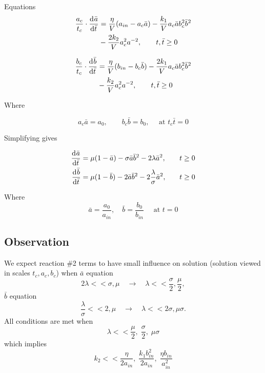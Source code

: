 \documentclass[12pt]{article}
\begin{document}
Equations
\begin{equation}
  \begin{aligned}
    \frac{a_c}{t_c}\cdot\frac{\mathrm{d}^{} {\bar{a}}}{\mathrm{d}{\bar{t}}^{}} &= \frac{\eta}{V}(a_{in}-a_c\bar{a})-\frac{k_1}{V}a_c\bar{a}b_c^2\bar{b}^2 \\
    &- \frac{2k_2}{V}a_c^2a^{-2},\qquad t,\bar{t}\ge 0 \\
  \end{aligned}
\end{equation}

\begin{equation}
  \begin{aligned}
    \frac{b_c}{t_c}\cdot\frac{\mathrm{d}^{} {\bar{b}}}{\mathrm{d}{\bar{t}}^{}} &= \frac{\eta}{V}(b_{in}-b_c\bar{b})-\frac{2k_1}{V}a_c\bar{a}b_c^2\bar{b}^2 \\
    &- \frac{k_2}{V}a_c^2a^{-2},\qquad t,\bar{t}\ge 0 \\
  \end{aligned}
\end{equation}

Where

\begin{equation}
  a_c\bar{a} = a_0, \qquad b_c\bar{b} = b_0, \quad\text{ at } t_c\bar{t} = 0
\end{equation}

Simplifying gives

\begin{equation}
  \begin{aligned}
    \frac{\mathrm{d}^{} {\bar{a}}}{\mathrm{d}{\bar{t}}^{}} &= \mu(1-\bar{a}) - \sigma\bar{a}\bar{b}^2 - 2\lambda\bar{a}^2, &\quad t&\ge0 \\
    \frac{\mathrm{d}^{} {\bar{b}}}{\mathrm{d}{\bar{t}}^{}} &= \mu(1-\bar{b}) - 2\bar{a}\bar{b}^2 - 2\frac{\lambda}{\sigma}\bar{a}^2, &\quad t&\ge0 \\
  \end{aligned}
\end{equation}

Where
\begin{equation}
  \bar{a} = \frac{a_0}{a_{in}}, \quad \bar{b} = \frac{b_0}{b_{in}} \quad \text{ at } t=0
\end{equation}


\subsection{Observation}
We expect reaction \#2 terms to have small influence on solution (solution
viewed in scales $t_c, a_c, b_c$) when $\bar{a}$ equation
$$2\lambda << \sigma, \mu \quad\longrightarrow\quad \lambda << \frac{\sigma}{2},\frac{\mu}{2},$$
$\bar{b}$ equation
$$\frac{\lambda}{\sigma} << 2, \mu \quad\longrightarrow\quad \lambda << 2\sigma, \mu\sigma.$$
All conditions are met when
$$\lambda << \frac{\mu}{2},\; \frac{\sigma}{2},\;\mu\sigma$$ which implies
$$k_2 << \frac{\eta}{2a_{in}},\; \frac{k_1b_{in}^2}{2a_{in}},\; \frac{\eta b_{in}}{a_{in}^2}$$
\end{document}

